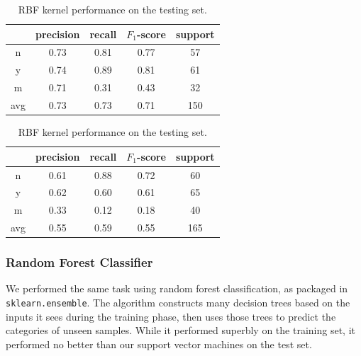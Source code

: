 \documentclass[11pt]{article}
\begin{document}
\begin{table}
  \centering
  \begin{tabular}[!htbp]{c|c c c c}
        & precision &recall &$F_1$-score &support \\ \hline
    n   & 0.73      &0.81   &0.77     &57      \\
    y   & 0.74      &0.89   &0.81     &61      \\
    m   & 0.71      &0.31   &0.43     &32      \\ \hline
    avg & 0.73      &0.73   &0.71     &150     \\
  \end{tabular}
  \caption{Reconstructing the training set with RBF kernel.}
  \label{tab:rbftrain}

  \begin{tabular}[!htbp]{c|c c c c}
        & precision &recall &$F_1$-score &support \\ \hline
    n   & 0.61      &0.88   &0.72     &60      \\
    y   & 0.62      &0.60   &0.61     &65      \\
    m   & 0.33      &0.12   &0.18     &40      \\ \hline
    avg & 0.55      &0.59   &0.55     &165     \\
  \end{tabular}
  \caption{RBF kernel performance on the testing set.}
  \label{tab:rbftest}
\end{table}


\subsubsection{Random Forest Classifier}
\label{sec:randfor}
We performed the same task using random forest classification, as
packaged in \verb|sklearn.ensemble|.  The algorithm constructs many
decision trees based on the inputs it sees during the training phase,
then uses those trees to predict the categories of unseen
samples. While it performed superbly on the training set, it performed
no better than our support vector machines on the test set.
\end{document}
